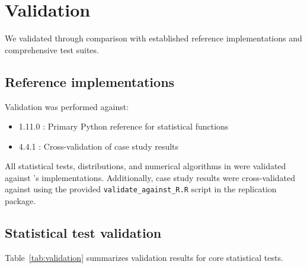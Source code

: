 \documentclass[article]{jss}
\begin{document}
\section{Validation} \label{sec:validation}

We validated  through comparison with established reference implementations and comprehensive test suites.

\subsection{Reference implementations}

Validation was performed against:

\begin{itemize}
\item {} 1.11.0 \citep{virtanen2020scipy}: Primary Python reference for statistical functions
\item {} 4.4.1 \citep{rcore2023}: Cross-validation of case study results
\end{itemize}

All statistical tests, distributions, and numerical algorithms in  were validated against 's implementations. Additionally, case study results were cross-validated against  using the provided \texttt{validate\_against\_R.R} script in the replication package.

\subsection{Statistical test validation}

Table~\ref{tab:validation} summarizes validation results for core statistical tests.
\end{document}
